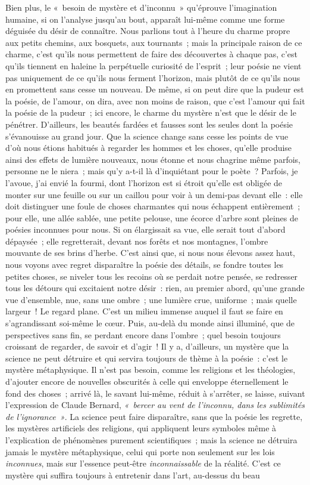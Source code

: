 \documentclass[french,twoside]{book} %
\begin{document}
Bien plus, le « besoin de mystère et d’inconnu » qu’éprouve l’imagination humaine, si on l’analyse jusqu’au bout, apparaît lui-même comme une forme déguisée du désir de connaître. Nous parlions tout à l’heure du charme propre aux petits chemins, aux bosquets, aux tournants ; mais la principale raison de ce charme, c’est qu’ils nous permettent de faire des découvertes à chaque pas, c’est qu’ils tiennent en haleine la perpétuelle curiosité de l’esprit ; leur poésie ne vient pas uniquement de ce qu’ils nous ferment l’horizon, mais plutôt de ce qu’ils nous en promettent sans cesse un nouveau. De même, si on peut dire que la pudeur est la poésie, de l’amour, on dira, avec non moins de raison, que c’est l’amour qui fait la poésie  de la pudeur ; ici encore, le charme du mystère n’est que le désir de le pénétrer. D’ailleurs, les beautés fardées et fausses sont les seules dont la poésie s’évanouisse au grand jour. Que la science change sans cesse les points de vue d’où nous étions habitués à regarder les hommes et les choses, qu’elle produise ainsi des effets de lumière nouveaux, nous étonne et nous chagrine même parfois, personne ne le niera ; mais qu’y a-t-il là d’inquiétant pour le poète ? Parfois, je l’avoue, j’ai envié la fourmi, dont l’horizon est si étroit qu’elle est obligée de monter sur une feuille ou sur un caillou pour voir à un demi-pas devant elle : elle doit distinguer une foule de choses charmantes qui nous échappent entièrement ; pour elle, une allée sablée, une petite pelouse, une écorce d’arbre sont pleines de poésies inconnues pour nous. Si on élargissait sa vue, elle serait tout d’abord dépaysée ; elle regretterait, devant nos forêts et nos montagnes, l’ombre mouvante de ses brins d’herbe. C’est ainsi que, si nous nous élevons assez haut, nous voyons avec regret disparaître la poésie des détails, se fondre toutes les petites choses, se niveler tous les recoins où se perdait notre pensée, se redresser tous les détours qui excitaient notre désir : rien, au premier abord, qu’une grande vue d’ensemble, nue, sans une ombre ; une lumière crue, uniforme ; mais quelle largeur ! Le regard plane. C’est un milieu immense auquel il faut se faire en s’agrandissant soi-même le cœur. Puis, au-delà du monde ainsi illuminé, que de perspectives sans fin, se perdant encore dans l’ombre ; quel besoin toujours croissant de regarder, de savoir et d’agir !  Il y a, d’ailleurs, un mystère que la science ne peut détruire et qui servira toujours de thème à la poésie : c’est le mystère métaphysique. Il n’est pas besoin, comme les religions et les théologies, d’ajouter encore de nouvelles obscurités à celle qui enveloppe éternellement le fond des choses ; arrivé là, le savant lui-même, réduit à s’arrêter, se laisse, suivant l’expression de Claude Bernard, \emph{« bercer au vent de l’inconnu, dans les sublimités de l’ignorance »}. La science peut faire disparaître, sans que la poésie les regrette, les mystères artificiels des religions, qui appliquent leurs symboles même à l’explication de phénomènes purement scientifiques ; mais la science ne détruira jamais le mystère métaphysique, celui qui porte non seulement sur les lois \emph{inconnues}, mais sur l’essence peut-être \emph{inconnaissable} de la réalité. C’est ce mystère qui suffira toujours à entretenir dans l’art, au-dessus du beau 
\end{document}
